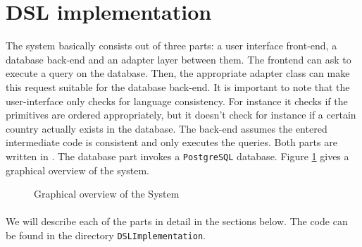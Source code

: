 \section{DSL implementation}
The system basically consists out of three parts: a user interface front-end,
a database back-end and an adapter layer between them. The frontend can ask to
execute a query on the database. Then, the appropriate adapter class can make
this
request suitable for the database back-end. It is important to note that
the user-interface only checks for language consistency. For instance it checks
if the primitives are ordered appropriately, but it doesn't check for instance if
a certain country actually exists in the database. The back-end assumes the
entered intermediate code is consistent and only executes the queries. Both
parts are written in \Csh{}. The database part invokes a \texttt{PostgreSQL}
database. Figure \ref{fig:systemOverview} gives a graphical overview of the system.
\begin{figure}[hbt]
\centering
{}
\caption{Graphical overview of the System}
\label{fig:systemOverview}
\end{figure}
\paragraph{}We will describe each of the parts in detail in the sections below. The code can be found in the directory \texttt{DSLImplementation}.